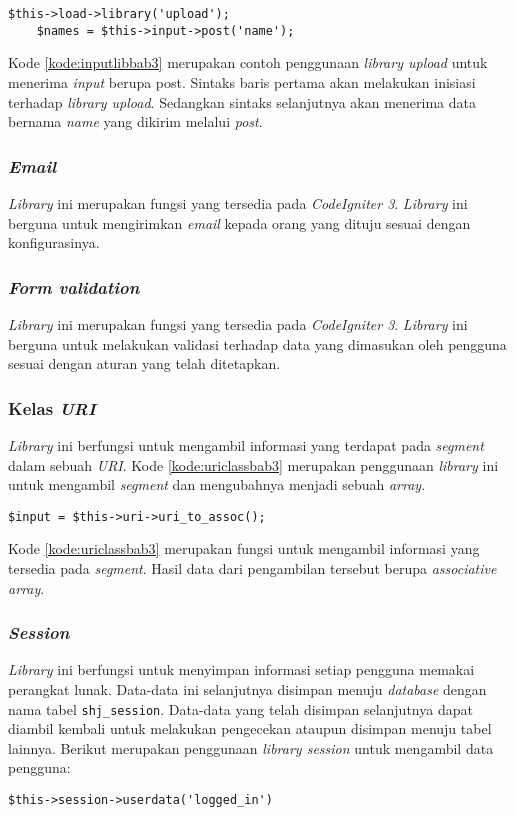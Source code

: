 \begin{lstlisting}[caption=Contoh penggunaan \textit{library input}, label=kode:inputlibbab3]
	$this->load->library('upload');
	$names = $this->input->post('name');
\end{lstlisting}

Kode \ref{kode:inputlibbab3} merupakan contoh penggunaan \textit{library upload} untuk menerima \textit{input} berupa post. Sintaks baris pertama akan melakukan inisiasi terhadap \textit{library upload}. Sedangkan sintaks selanjutnya akan menerima data bernama \textit{name} yang dikirim melalui \textit{post}.

\subsubsection{\textit{Email}}
\textit{Library} ini merupakan fungsi yang tersedia pada \textit{CodeIgniter 3}. \textit{Library} ini berguna untuk mengirimkan \textit{email} kepada orang yang dituju sesuai dengan konfigurasinya.

\subsubsection{\textit{Form validation}}
\textit{Library} ini merupakan fungsi yang tersedia pada \textit{CodeIgniter 3}. \textit{Library} ini berguna untuk melakukan validasi terhadap data yang dimasukan oleh pengguna sesuai dengan aturan yang telah ditetapkan.

\subsubsection{Kelas \textit{URI}}
\textit{Library} ini berfungsi untuk mengambil informasi yang terdapat pada \textit{segment} dalam sebuah \textit{URI}. Kode \ref{kode:uriclassbab3} merupakan penggunaan \textit{library} ini untuk mengambil \textit{segment} dan mengubahnya menjadi sebuah \textit{array}.
\begin{lstlisting}[caption=Contoh penggunaan \textit{library URI}, label=kode:uriclassbab3]
	$input = $this->uri->uri_to_assoc();
\end{lstlisting}
Kode \ref{kode:uriclassbab3} merupakan fungsi untuk mengambil informasi yang tersedia pada \textit{segment}. Hasil data dari pengambilan tersebut berupa \textit{associative array}.

\subsubsection{\textit{Session}}
\textit{Library} ini berfungsi untuk menyimpan informasi setiap pengguna memakai perangkat lunak. Data-data ini selanjutnya disimpan menuju \textit{database} dengan nama tabel \texttt{shj\_session}. Data-data yang telah disimpan selanjutnya dapat diambil kembali untuk melakukan pengecekan ataupun disimpan menuju tabel lainnya. Berikut merupakan penggunaan \textit{library session} untuk mengambil data pengguna:
\begin{lstlisting}[caption=Contoh penggunaan \textit{library session}, label=kode:sessionbab3]
	$this->session->userdata('logged_in')
\end{lstlisting}

